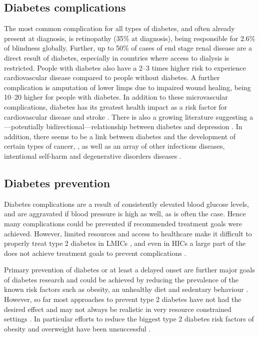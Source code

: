\subsection{Diabetes complications}

The most common complication for all types of diabetes, and often already present at diagnosis, is retinopathy (35\% at diagnosis), being responsible for 2.6\% of blindness globally. Further, up to 50\% of cases of end stage renal disease are a direct result of diabetes, especially in countries where access to dialysis is restricted. People with diabetes also have a 2--3 times higher risk to experience cardiovascular disease compared to people without diabetes. A further complication is amputation of lower limps due to impaired wound healing, being 10--20 higher for people with diabetes. In addition to these microvascular complications, diabetes has its greatest health impact as a risk factor for cardiovascular disease and stroke \parencite{WorldHealthOrganization2016}. There is also a growing literature suggesting a---potentially bidirectional---relationship between diabetes and depression \parencite{VanDooren2013,Nouwen2010,Roy2012}. In addition, there seems to be a link between diabetes and the development of certain types of cancer, \parencite{Tsilidis2015,Nead2015}, as well as an array of other \DIFdelbegin {}\DIFdelend infectious diseases, intentional self-harm and degenerative disorders diseases \parencite{Seshasai2011}.


\subsection{Diabetes prevention}

Diabetes complications are a result of consistently elevated blood glucose levels, and  are aggravated if blood pressure is high as well, as is often the case. Hence many complications could be prevented if recommended treatment goals were achieved. However, limited resources and access to healthcare make it difficult to properly treat type 2 diabetes in \acp{LMIC} \parencite{Villalpando2010}, and even in \acp{HIC} a large part of the \DIFdelbegin {}\DIFdelend \DIFaddbegin {}\DIFaddend does not achieve treatment goals to prevent complications \parencite{DiabetesUK2012}. 

Primary prevention of diabetes or at least a delayed onset are further major goals of diabetes research and could be achieved by reducing the prevalence of the known risk factors such as obesity, an unhealthy diet and sedentary behaviour \parencite{WorldHealthOrganization2016}. However, so far most approaches to prevent type 2 diabetes have not had the desired effect and may not always be realistic in very resource constrained settings \parencite{White2016}. In particular efforts to reduce the biggest type 2 diabetes risk factors of obesity and overweight have been unsuccessful \parencite{Roberto2015}.

